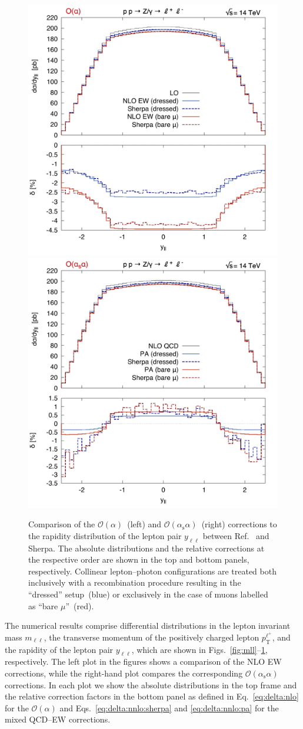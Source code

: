 \documentclass[11pt]{cernrep}
\newcommand{\order}{\ensuremath{\mathcal{O}}}
\newcommand{\alphas}{\ensuremath{\alpha_\mathrm{s}}}
\newcommand{\rT}{\ensuremath{\mathrm{T}}} %
\DeclareRobustCommand{\Pl}{{\ensuremath{\ell}}}
\DeclareRobustCommand{\Plp}{{\ensuremath{\ell^+}}}
\begin{document}
\begin{figure}
  \includegraphics[width=.48\linewidth]{images/Z_yll_LO.pdf} \hfill
  \includegraphics[width=.48\linewidth]{images/Z_yll_NLO.pdf}
  \caption{
    Comparison of the $\order(\alpha)$~(left) and $\order(\alphas\alpha)$~(right) corrections to the rapidity distribution of the lepton pair $y_{\Pl\Pl}$ between Ref.~\cite{Dittmaier:2015rxo} and Sherpa.
    The absolute distributions and the relative corrections at the respective order are shown in the top and bottom panels, respectively.
    Collinear lepton--photon configurations are treated both inclusively with a recombination procedure resulting in the ``dressed'' setup~(blue) or exclusively in the case of muons labelled as ``bare $\mu$''~(red).
  }
  \label{fig:yll}
\end{figure}


The numerical results comprise differential distributions in the lepton invariant mass $m_{\Pl\Pl}$, the transverse momentum of the positively charged lepton $p_\rT^\Plp$, and the rapidity of the lepton pair $y_{\Pl\Pl}$, which are shown in Figs.~\ref{fig:mll}--\ref{fig:yll}, respectively.
The left plot in the figures shows a comparison of the NLO EW corrections, while the right-hand plot compares the corresponding $\order(\alphas\alpha)$ corrections. 
In each plot we show the absolute distributions in the top frame and the relative correction factors in the bottom panel as defined in Eq.~\eqref{eq:delta:nlo} for the $\order(\alpha)$ and Eqs.~\eqref{eq:delta:nnlo:sherpa} and \eqref{eq:delta:nnlo:pa} for the mixed QCD--EW corrections.
\end{document}
